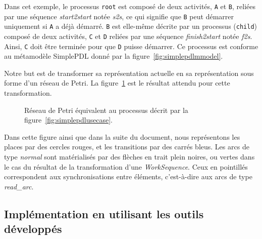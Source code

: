 Dans cet exemple, le processus \texttt{root} est composé de deux activités,
\texttt{A} et \texttt{B}, reliées par une séquence \emph{start2start} notée
\emph{s2s}, ce qui signifie que \texttt{B} peut démarrer uniquement si
\texttt{A} a déjà démarré. \texttt{B} est elle-même décrite par un processus
(\texttt{child}) composé de deux activités, \texttt{C} et \texttt{D} reliées
par une séquence \emph{finish2start} notée \emph{f2s}. Ainsi, \texttt{C} doit
être terminée pour que \texttt{D} puisse démarrer. Ce processus est
conforme au métamodèle SimplePDL donné par la figure~\ref{fig:simplepdlmmodel}.

Notre but est de transformer sa représentation actuelle en sa représentation
sous forme d'un réseau de Petri. La figure~\ref{fig:petrinetusecase} est le
résultat attendu pour cette transformation.

\begin{figure}[h]
  \begin{center}
    \resizebox{1.0\linewidth}{!}{}
    \caption{Réseau de Petri équivalent au processus décrit par la
    figure~\ref{fig:simplepdlusecase}.}
    \label{fig:petrinetusecase}
  \end{center}
\end{figure}

Dans cette figure ainsi que dans la suite du document, nous représentons les
places par des cercles rouges, et les transitions par des carrés bleus. Les
arcs de type \emph{normal} sont matérialisés par des flèches en trait plein
noires, ou vertes dans le cas du résultat de la transformation d'une
\emph{WorkSequence}. Ceux en pointillés correspondent aux synchronisations
entre éléments, c'est-à-dire aux arcs de type \emph{read\_arc}.


\FloatBarrier

\subsection{Implémentation en utilisant les outils développés}


